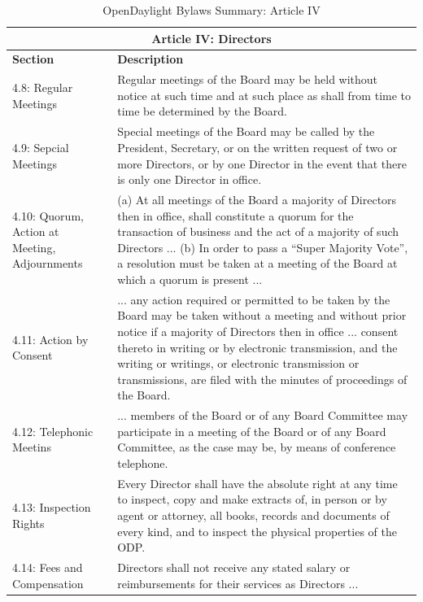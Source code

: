 \documentclass[a4paper, 12pt]{book}
\begin{document}
\begin{table}[H]
  \begin{center}
    \begin{tabular}{ | p{4cm} | p{11cm} | }
    \toprule
    \multicolumn {2}{|c|}{\textbf{Article IV: Directors}} \\
    \hline
    \textbf{Section} & \textbf{Description} \\
    \hline
    4.8: Regular Meetings & Regular meetings of the Board may be held without notice at such time and at such place as shall from time to time be determined by the Board. \\
    \hline
    4.9: Sepcial Meetings & Special meetings of the Board may be called by the President, Secretary, or on the written request of two or more Directors, or by one Director in the event that there is only one Director in office. \\
    \hline
    4.10: Quorum, Action at Meeting, Adjournments & (a) At all meetings of the Board a majority of Directors then in office, shall constitute a quorum for the transaction of business and the act of a majority of such Directors ... (b) In order to pass a “Super Majority Vote”, a resolution must be taken at a meeting of the Board at which a quorum is present ... \\
    \hline
    4.11: Action by Consent & ... any action required or permitted to be taken by the Board may be taken without a meeting and without prior notice if a majority of Directors then in office ... consent thereto in writing or by electronic transmission, and the writing or writings, or electronic transmission or transmissions, are filed with the minutes of proceedings of the Board. \\
    \hline
    4.12: Telephonic Meetins & ... members of the Board or of any Board Committee may participate in a meeting of the Board or of any Board Committee, as the case may be, by means of conference telephone. \\
    \hline
    4.13: Inspection Rights & Every Director shall have the absolute right at any time to inspect, copy and make extracts of, in person or by agent or attorney, all books, records and documents of every kind, and to inspect the physical properties of the ODP. \\
    \hline
    4.14: Fees and Compensation & Directors shall not receive any stated salary or reimbursements for their services as Directors ... \\
    \bottomrule
    \end{tabular}
    \caption{OpenDaylight Bylaws Summary: Article IV}
    \label{tab:odlbylaws-art04}
  \end{center}
\end{table}
\end{document}
